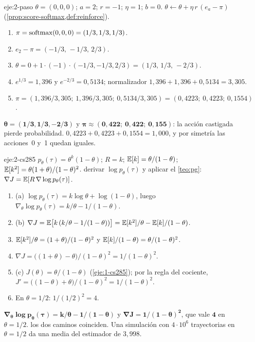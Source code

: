 \begin{solucion}{eje:2-paso}
\datos $\theta=(0,0,0)$; $a=2$; $r=-1$; $\eta=1$; $b=0$.
\planteamiento $\theta\leftarrow\theta+\eta\,r\,(e_a-\pi)$ (\cref{prop:score-softmax,def:reinforce}).
\pasos
\begin{enumerate}[label=\arabic*.]
  \item $\pi=\operatorname{softmax}(0,0,0)=(1/3,1/3,1/3)$.
  \item $e_2-\pi=(-1/3,\,-1/3,\,2/3)$.
  \item $\theta=0+1\cdot(-1)\cdot(-1/3,-1/3,2/3)=(1/3,\,1/3,\,-2/3)$.
  \item $e^{1/3}=1{,}396$ y $e^{-2/3}=0{,}5134$; normalizador $1{,}396+1{,}396+0{,}5134=3{,}305$.
  \item $\pi=(1{,}396/3{,}305;\ 1{,}396/3{,}305;\ 0{,}5134/3{,}305)=(0{,}4223;\ 0{,}4223;\ 0{,}1554)$.
\end{enumerate}
\resultado $\mathbf{\theta=(1/3,1/3,-2/3)}$ y $\mathbf{\pi\approx(0{,}422;\ 0{,}422;\ 0{,}155)}$: la acción castigada pierde probabilidad.
\comprobacion $0{,}4223+0{,}4223+0{,}1554=1{,}000$, y por simetría las acciones~0 y~1 quedan iguales.
\end{solucion}

\begin{solucion}{eje:2-cs285}
\datos $p_\theta(\tau)=\theta^{k}(1-\theta)$; $R=k$; $\mathbb{E}[k]=\theta/(1-\theta)$; $\mathbb{E}[k^{2}]=\theta(1+\theta)/(1-\theta)^{2}$.
\planteamiento derivar $\log p_\theta(\tau)$ y aplicar el \cref{teo:pg}: $\nabla J=\mathbb{E}[R\,\nabla\log p_\theta(\tau)]$.
\pasos
\begin{enumerate}[label=\arabic*.]
  \item (a) $\log p_\theta(\tau)=k\log\theta+\log(1-\theta)$, luego $\nabla_\theta\log p_\theta(\tau)=k/\theta-1/(1-\theta)$.
  \item (b) $\nabla J=\mathbb{E}\bigl[k\,(k/\theta-1/(1-\theta))\bigr]=\mathbb{E}[k^{2}]/\theta-\mathbb{E}[k]/(1-\theta)$.
  \item $\mathbb{E}[k^{2}]/\theta=(1+\theta)/(1-\theta)^{2}$ y $\mathbb{E}[k]/(1-\theta)=\theta/(1-\theta)^{2}$.
  \item $\nabla J=\bigl((1+\theta)-\theta\bigr)/(1-\theta)^{2}=1/(1-\theta)^{2}$.
  \item (c) $J(\theta)=\theta/(1-\theta)$ (\cref{eje:1-cs285}); por la regla del cociente, $J'=\bigl((1-\theta)+\theta\bigr)/(1-\theta)^{2}=1/(1-\theta)^{2}$.
  \item En $\theta=1/2$: $1/(1/2)^{2}=4$.
\end{enumerate}
\resultado $\mathbf{\nabla_\theta\log p_\theta(\tau)=k/\theta-1/(1-\theta)}$ y $\mathbf{\nabla J=1/(1-\theta)^{2}}$, que vale $\mathbf{4}$ en $\theta=1/2$.
\comprobacion los dos caminos coinciden. Una simulación con $4\cdot 10^{6}$ trayectorias en $\theta=1/2$ da una media del estimador de $3{,}998$.
\end{solucion}

